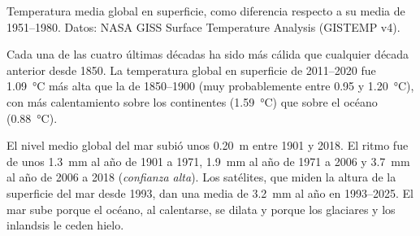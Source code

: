 \begin{omfigure}

{\small Temperatura media global en superficie, como diferencia respecto a su media
de 1951--1980. Datos: NASA GISS Surface Temperature Analysis (GISTEMP v4).}
\end{omfigure}

\begin{proposition}\label{prop:g12:climate-change:warming}
Cada una de las cuatro últimas décadas ha sido más cálida que cualquier década anterior
desde 1850. La temperatura global en superficie de 2011--2020 fue \qty{1.09}{\degreeCelsius}
más alta que la de 1850--1900 (muy probablemente entre 0.95 y
\qty{1.20}{\degreeCelsius}), con más calentamiento sobre los continentes
(\qty{1.59}{\degreeCelsius}) que sobre el océano (\qty{0.88}{\degreeCelsius}).
\end{proposition}

\begin{proposition}\label{prop:g12:climate-change:sea}
El nivel medio global del mar subió unos \qty{0.20}{m} entre 1901 y 2018.
El ritmo fue de unos \qty{1.3}{mm} al año de 1901 a 1971,
\qty{1.9}{mm} al año de 1971 a 2006 y \qty{3.7}{mm} al año de
2006 a 2018 (\emph{confianza alta}). Los satélites, que miden la altura de
la superficie del mar desde 1993, dan una media de \qty{3.2}{mm} al año en
1993--2025. El mar sube porque el océano, al calentarse, se dilata y porque
los glaciares y los inlandsis le ceden hielo.
\end{proposition}

